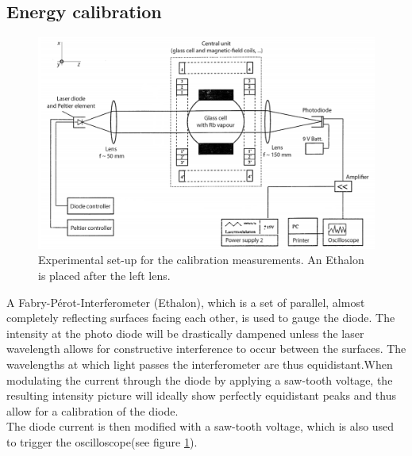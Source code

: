 \subsection{Energy calibration}
\begin{figure}[htb]
\includegraphics[width=1.0\linewidth]{graphics/generalsetup}
\caption[Experimental set-up for the Calibration]{Experimental set-up for the calibration measurements. An Ethalon is placed after the left lens.\cite{anleitung}}
\label{fig:calibration setup}
\end{figure}
A Fabry-Pérot-Interferometer (Ethalon), which is a set of parallel, almost completely reflecting surfaces facing each other, is used to gauge the diode. The intensity at the photo diode will be drastically dampened unless the laser wavelength allows for constructive interference to occur between the surfaces. The wavelengths at which light passes the interferometer are thus equidistant.When modulating the current through the diode by applying a saw-tooth voltage, the resulting intensity picture will ideally show perfectly equidistant peaks and thus allow for a calibration of the diode.\\

The diode current is then modified with a saw-tooth voltage, which is also used to trigger the oscilloscope(see figure \ref{fig:calibration setup}). 


